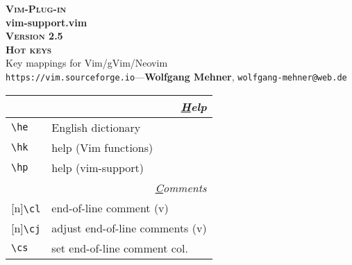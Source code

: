 \documentclass[oneside,10pt,landscape,DIV16]{scrartcl}
\newcommand{\Pluginversion}{2.5}
\newcommand{\Rep}{{\scriptsize{[n]}}}
\begin{document}
%

\begin{multicols}{3}
%
\begin{center}
%
\textbf{\textsc{\small{Vim-Plug-in}}}\\
\textbf{\LARGE{vim-support.vim}}\\
\textbf{\textsc{\small{Version \Pluginversion}}}\\
\vspace{1mm}%
\textbf{\textsc{\Huge{Hot keys}}}\\ 
\vspace{1mm}%
Key mappings for Vim/gVim/Neovim\\
{\tiny  \texttt{https://vim.sourceforge.io}\hspace{1.5mm}---\hspace{1.5mm}\textbf{Wolfgang Mehner},  \texttt{wolfgang-mehner@web.de}}\\
\vspace{1.0mm}
%
\begin{tabular}[]{|p{11mm}|p{58mm}|}
\hline 
\multicolumn{2}{|r|}{\textsl{\underline{H}elp}}\\[1.0ex]
\hline \verb'\he'                 & English dictionary   \\
\hline \verb'\hk'                 & help (Vim functions) \\
\hline \verb'\hp'                 & help (vim-support)   \\
\hline 
\hline
\multicolumn{2}{|r|}{\textsl{\underline{C}omments}}                       \\[1.0ex]
\hline \Rep\verb'\cl'   & end-of-line comment               \hfill (v)\\
\hline \Rep\verb'\cj'   & adjust end-of-line comments       \hfill (v)\\
\hline     \verb'\cs'   & set end-of-line comment col.      \\

\end{tabular}
\end{center}
\end{multicols}
\end{document}
